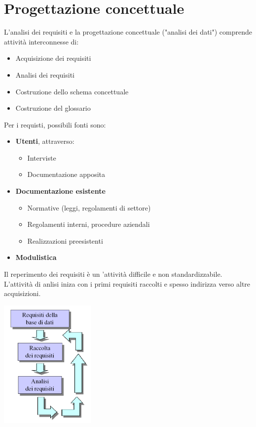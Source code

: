 \documentclass[12pt]{article}
\begin{document}
\section{Progettazione concettuale}
L'analisi dei requisiti e la progettazione concettuale ("analisi dei dati") comprende attività interconnesse di:
\begin{itemize}
    \item Acquisizione dei requisiti
    \item Analisi dei requisiti
    \item Costruzione dello schema concettuale
    \item Costruzione del glossario
\end{itemize}
Per i requisti, possibili fonti sono:
\begin{itemize}
    \item \textbf{Utenti}, attraverso:
    \begin{itemize}
        \item Interviste
        \item Documentazione apposita
    \end{itemize}
    \item \textbf{Documentazione esistente}
    \begin{itemize}
        \item Normative (leggi, regolamenti di settore)
        \item Regolamenti interni, procedure aziendali
        \item Realizzazioni preesistenti
    \end{itemize}
    \item \textbf{Modulistica}
\end{itemize}
Il reperimento dei requisiti è un 'attività difficile e non standardizzabile. L'attività di anlisi iniza con i primi requisiti raccolti e spesso indirizza verso altre acquisizioni.
\begin{center}
    \includegraphics[width = 0.35\textwidth]{Images/44.PNG}
\end{center}
\end{document}
